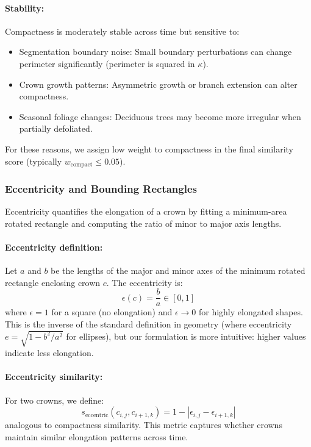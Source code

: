 \paragraph{Stability:}
Compactness is moderately stable across time but sensitive to:
\begin{itemize}
    \item Segmentation boundary noise: Small boundary perturbations can change perimeter significantly (perimeter is squared in $\kappa$).
    \item Crown growth patterns: Asymmetric growth or branch extension can alter compactness.
    \item Seasonal foliage changes: Deciduous trees may become more irregular when partially defoliated.
\end{itemize}
For these reasons, we assign low weight to compactness in the final similarity score (typically $w_{\text{compact}} \leq 0.05$).

\subsubsection{Eccentricity and Bounding Rectangles}

Eccentricity quantifies the elongation of a crown by fitting a minimum-area rotated rectangle and computing the ratio of minor to major axis lengths.

\paragraph{Eccentricity definition:}
Let $a$ and $b$ be the lengths of the major and minor axes of the minimum rotated rectangle enclosing crown $c$. The eccentricity is:
\[
\epsilon(c) = \frac{b}{a} \in [0, 1]
\]
where $\epsilon = 1$ for a square (no elongation) and $\epsilon \to 0$ for highly elongated shapes. This is the inverse of the standard definition in geometry (where eccentricity $e = \sqrt{1 - b^2/a^2}$ for ellipses), but our formulation is more intuitive: higher values indicate less elongation.

\paragraph{Eccentricity similarity:}
For two crowns, we define:
\[
s_{\text{eccentric}}(c_{i,j}, c_{i+1,k}) = 1 - |\epsilon_{i,j} - \epsilon_{i+1,k}|
\]
analogous to compactness similarity. This metric captures whether crowns maintain similar elongation patterns across time.

